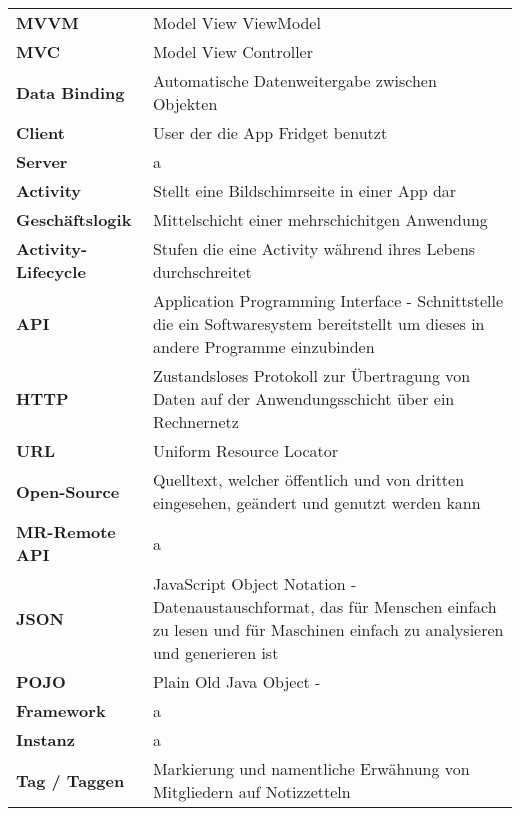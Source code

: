 \begin{table}[h!]
			\centering
			\label{my-label}
			\begin{tabular}{p{4cm}p{10cm}}
				\textbf{MVVM} & Model View ViewModel  \\
				\textbf{MVC} & Model View Controller  \\
				\textbf{Data Binding} & Automatische Datenweitergabe zwischen Objekten  \\
				\textbf{Client} & User der die App Fridget benutzt   \\
				
				\textbf{Server} & a    \\
				\textbf{Activity} & Stellt eine Bildschimrseite in einer App dar   \\
				\textbf{Geschäftslogik} & Mittelschicht einer mehrschichitgen Anwendung  \\
				\textbf{Activity-Lifecycle}& Stufen die eine Activity während ihres Lebens durchschreitet   \\
				
				\textbf{API} & Application Programming Interface - Schnittstelle die ein Softwaresystem bereitstellt um dieses in andere Programme einzubinden  \\
				
			
				\textbf{HTTP} & Zustandsloses Protokoll zur Übertragung von Daten auf der Anwendungsschicht über ein Rechnernetz  \\
				\textbf{URL} & Uniform Resource Locator  \\
				\textbf{Open-Source} & Quelltext, welcher öffentlich und von dritten eingesehen, geändert und genutzt werden kann  \\
				
				\textbf{MR-Remote API} & a  \\
				\textbf{JSON} & JavaScript Object Notation - Datenaustauschformat, das für Menschen einfach zu lesen und für Maschinen einfach zu analysieren und generieren ist   \\
				\textbf{POJO} & Plain Old Java Object  -   \\
				\textbf{Framework} & a  \\
				
				\textbf{Instanz} & a  \\
				\textbf{Tag / Taggen} &  Markierung und namentliche Erwähnung von Mitgliedern auf Notizzetteln   \\
				
					\end{tabular}
		\end{table}
		
